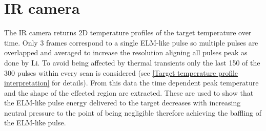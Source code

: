 \section{IR camera}\label{IR camera}
The IR camera returns 2D temperature profiles of the target temperature over time. Only 3 frames correspond to a single ELM-like pulse so multiple pulses are overlapped and averaged to increase the resolution aligning all pulses peak as done by Li.\cite{Li2020} To avoid being affected by thermal transients only the last 150 of the 300 pulses within every scan is considered (see \autoref{Target temperature profile interpretation} for details). From this data the time dependent peak temperature and the shape of the effected region are extracted. These are used to show that the ELM-like pulse energy delivered to the target decreases with increasing neutral pressure to the point of being negligible therefore achieving the baffling of the ELM-like pulse.


